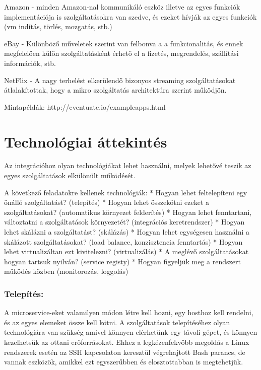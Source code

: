 \documentclass[11pt,magyar,a4paper,oneside,]{report}
\begin{document}
Amazon - minden Amazon-nal kommunikáló eszköz illetve az egyes funkciók
implementációja is szolgáltatásokra van szedve, és ezeket hívják az
egyes funkciók (vm indítás, törlés, mozgatás, stb.)

eBay - Különböző műveletek szerint van felbonva a a funkcionalitás, és
ennek megfelelően külön szolgáltatásként érhető el a fizetés,
megrendelés, szállítási információk, stb.

NetFlix - A nagy terhelést elkerülendő bizonyos streaming
szolgáltatásokat átlalakítottak, hogy a mikro szolgáltatás architektúra
szerint működjön.

Mintapéldák: http://eventuate.io/exampleapps.html

\chapter{Technológiai
áttekintés}\label{technoluxf3giai-uxe1ttekintuxe9s}

Az integrációhoz olyan technológiákat lehet használni, melyek lehetővé
teszik az egyes szolgáltatások elkülönült működését.

A következő feladatokre kellenek technológiák: * Hogyan lehet
feltelepíteni egy önálló szolgáltatást? (telepítés) * Hogyan lehet
összekötni ezeket a szolgáltatásokat? (automatikus környezet felderítés)
* Hogyan lehet fenntartani, változtatni a szolgáltatások környezetét?
(integrációs keretrendszer) * Hogyan lehet skálázni a szolgáltatást?
(skálázás) * Hogyan lehet egységesen használni a skálázott
szolgáltatásokat? (load balance, konzisztencia fenntartás) * Hogyan
lehet virtualizáltan ezt kivitelezni? (virtualizálás) * A meglévő
szolgáltatásokat hogyan tartsuk nyilván? (service registy) * Hogyan
figyeljük meg a rendszert működés közben (monitorozás, loggolás)

\subsection{Telepítés:}\label{telepuxedtuxe9s}

A microservice-eket valamilyen módon létre kell hozni, egy hosthoz kell
rendelni, és az egyes elemeket össze kell kötni. A szolgáltatások
telepítéséhez olyan technológiára van szükség amivel könnyen elérhetünk
egy távoli gépet, és könnyen kezelhetsük az ottani erőforrásokat. Ehhez
a legkézenfekvőbb megoldás a Linux rendszerek esetén az SSH kapcsolaton
keresztül végrehajtott Bash parancs, de vannak eszközök, amikkel ezt
egyszerűbben és elosztottabban is megtehetjük.
\end{document}
